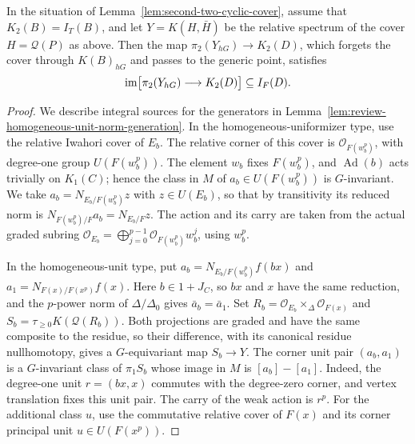 \begin{lemma}\label{lem:second-two-orbit-image}
In the situation of Lemma~\ref{lem:second-two-cyclic-cover}, assume that $K_2(B)=I_T(B)$, and let $Y=K(H,\bar H)$ be the relative spectrum of the cover $H=\mathcal Q(P)$ as above.
Then the map $\pi_2(Y_{hG})\to K_2(D)$, which forgets the cover through $K(B)_{hG}$ and passes to the generic point, satisfies
\[
 \operatorname{im}\bigl[\pi_2(Y_{hG})\longrightarrow K_2(D)\bigr]\subseteq I_F(D).
\]
\end{lemma}
\begin{proof}
We describe integral sources for the generators in Lemma~\ref{lem:review-homogeneous-unit-norm-generation}.
In the homogeneous-uniformizer type, use the relative Iwahori cover of $E_b$.
The relative corner of this cover is $\mathcal O_{F(w_b^p)}$, with degree-one group $U(F(w_b^p))$.
The element $w_b$ fixes $F(w_b^p)$, and $\operatorname{Ad}(b)$ acts trivially on $K_1(C)$; hence the class in $M$ of $a_b\in U(F(w_b^p))$ is $G$-invariant.
We take $a_b=N_{E_b/F(w_b^p)}z$ with $z\in U(E_b)$, so that by transitivity its reduced norm is $N_{F(w_b^p)/F}a_b=N_{E_b/F}z$.
The action and its carry are taken from the actual graded subring $\mathcal O_{E_b}=\bigoplus_{j=0}^{p-1}\mathcal O_{F(w_b^p)}w_b^j$, using $w_b^p$.

In the homogeneous-unit type, put $a_b=N_{E_b/F(w_b^p)}f(bx)$ and $a_1=N_{F(x)/F(x^p)}f(x)$.
Here $b\in1+J_C$, so $bx$ and $x$ have the same reduction, and the $p$-power norm of $\Delta/\Delta_0$ gives $\bar a_b=\bar a_1$.
Set $R_b=\mathcal O_{E_b}\times_\Delta\mathcal O_{F(x)}$ and $S_b=\tau_{\ge0}K(\mathcal Q(R_b))$.
Both projections are graded and have the same composite to the residue, so their difference, with its canonical residue nullhomotopy, gives a $G$-equivariant map $S_b\to Y$.
The corner unit pair $(a_b,a_1)$ is a $G$-invariant class of $\pi_1S_b$ whose image in $M$ is $[a_b]-[a_1]$.
Indeed, the degree-one unit $r=(bx,x)$ commutes with the degree-zero corner, and vertex translation fixes this unit pair.
The carry of the weak action is $r^p$.
For the additional class $u$, use the commutative relative cover of $F(x)$ and its corner principal unit $u\in U(F(x^p))$.


\end{proof}
